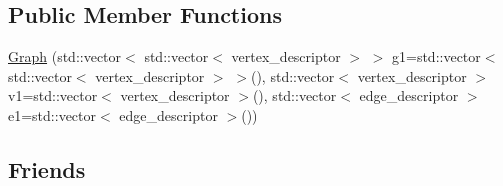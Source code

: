 \subsection*{Public Member Functions}
\begin{DoxyCompactItemize}
\item 
\hyperlink{classGraph_a5a30f03525f4843506f91f05bf496891}{Graph} (std\-::vector$<$ std\-::vector$<$ vertex\-\_\-descriptor $>$ $>$ g1=std\-::vector$<$ std\-::vector$<$ vertex\-\_\-descriptor $>$ $>$(), std\-::vector$<$ vertex\-\_\-descriptor $>$ v1=std\-::vector$<$ vertex\-\_\-descriptor $>$(), std\-::vector$<$ edge\-\_\-descriptor $>$ e1=std\-::vector$<$ edge\-\_\-descriptor $>$())
\end{DoxyCompactItemize}
\subsection*{Friends}
